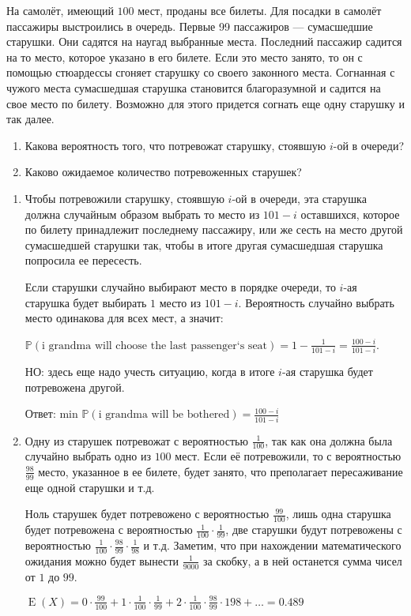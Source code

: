 \documentclass[nobib]{tufte-handout}
\theoremstyle{definition}
\newcounter{problem}
\newenvironment{problem}%
{%
\refstepcounter{problem}%
     \hypertarget{problem:{\theproblem}}{}
     \Writetofile{solution_file}{\protect\hypertarget{soln:\theproblem}{}}
     \begin{myenum}[label=\bfseries\protect\hyperlink{soln:\theproblem}{\theproblem},ref=\theproblem]
     \item%
    }%
    {%
    \end{myenum}}
\DeclareMathOperator{\E}{E}
\renewcommand{\P}{\mathbb{P}}
\begin{document}
\begin{problem}
На самолёт, имеющий $100$ мест, проданы все билеты.
Для посадки в самолёт пассажиры выстроились в очередь.
Первые 99 пассажиров — сумасшедшие старушки.
Они садятся на наугад выбранные места. Последний пассажир садится на то место,
которое указано в его билете. Если это место занято, то он с
помощью стюардессы сгоняет старушку со своего законного места.
Согнанная с чужого места сумасшедшая старушка становится
благоразумной и садится на свое место по билету. Возможно для
этого придется согнать еще одну старушку и так далее.
\begin{enumerate}
\item Какова вероятность того, что потревожат старушку, стоявшую $i$-ой в очереди?
\item Каково ожидаемое количество потревоженных старушек?
\end{enumerate}

\begin{sol}
\begin{enumerate}
\item Чтобы потревожили старушку, стоявшую $i$-ой в очереди,
эта старушка должна случайным образом выбрать то место из $101-i$ оставшихся,
которое по билету принадлежит последнему пассажиру,
или же сесть на место другой сумасшедшей старушки так,
чтобы в итоге другая сумасшедшая старушка попросила ее пересесть.

Если старушки случайно выбирают место в порядке очереди,
то $i$-ая старушка будет выбирать $1$ место из $101-i$.
Вероятность случайно выбрать место одинакова для всех мест, а значит:

$\P(\text{i grandma will choose the last passenger`s seat})=1 - \frac{1}{101-i} =
 \frac{100-i}{101-i}$.

НО: здесь еще надо учесть ситуацию,
когда в итоге $i$-ая старушка будет потревожена другой.

Ответ: min $\P(\text{i grandma will be bothered}) =\frac{100-i}{101-i}$

\item Одну из старушек потревожат с вероятностью $\frac{1}{100}$,
так как она должна была случайно выбрать одно из $100$ мест.
Если её потревожили, то с вероятностью $\frac{98}{99}$ место, указанное в ее билете,
будет занято, что преполагает пересаживание еще одной старушки и т.д.

Ноль старушек будет потревожено с вероятностью $\frac{99}{100}$,
лишь одна старушка будет потревожена с вероятностью $\frac{1}{100} \cdot \frac{1}{99}$,
две старушки будут потревожены с вероятностью
$\frac{1}{100} \cdot \frac{98}{99} \cdot \frac{1}{98}$ и т.д.
Заметим, что при нахождении математического ожидания
можно будет вынести $\frac{1}{9000}$ за скобку, а в ней останется
сумма чисел  от $1$ до $99$.

$\E(X) = 0 \cdot \frac{99}{100} + 1 \cdot \frac{1}{100} \cdot \frac{1}{99} +
2\cdot \frac{1}{100} \cdot \frac{98}{99} \cdot {1}{98} + \ldots  = 0.489$
\end{enumerate}
\end{sol}

\end{problem}
\end{document}
